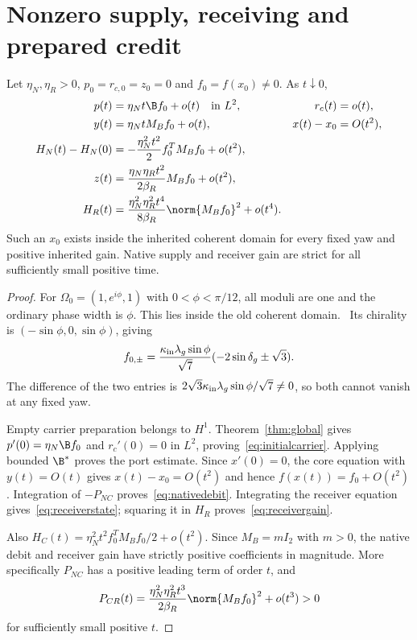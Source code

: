 \section{Nonzero supply, receiving and prepared credit}\label{sec:activity}
\begin{proposition}\label{prop:launch}
Let $\eta_N,\eta_R>0$, $p_0=r_{c,0}=z_0=0$ and $f_0=f(x_0)\ne0$. As $t\downarrow0$,
\begin{align}
 p(t)&=\eta_Nt\B f_0+o(t)\quad\hbox{in }L^2,
 &r_c(t)&=o(t),\label{eq:initialcarrier}\\
 y(t)&=\eta_NtM_Bf_0+o(t),
 &x(t)-x_0&=O(t^2),\label{eq:initialports}\\
 H_N(t)-H_N(0)&=-\frac{\eta_N^2t^2}{2}f_0^TM_Bf_0+o(t^2),\label{eq:nativedebit}\\
 z(t)&=\frac{\eta_N\eta_Rt^2}{2\beta_R}M_Bf_0+o(t^2),\label{eq:receiverstate}\\
 H_R(t)&=\frac{\eta_N^2\eta_R^2t^4}{8\beta_R}\norm{M_Bf_0}^2+o(t^4).\label{eq:receivergain}
\end{align}
Such an $x_0$ exists inside the inherited coherent domain for every fixed yaw and positive inherited gain. Native supply and receiver gain are strict for all sufficiently small positive time.
\end{proposition}
\begin{proof}
For $\Omega_0=(1,e^{i\phi},1)$ with $0<\phi<\pi/12$, all moduli are one and the ordinary phase width is $\phi$. This lies inside the old coherent domain.~\cite{intensity}
Its chirality is $(-\sin\phi,0,\sin\phi)$, giving
\begin{equation}\label{eq:nonzero}
 f_{0,\pm}=\frac{\kappa_{\rm in}\lambda_g\sin\phi}{\sqrt7}
          (-2\sin\delta_g\pm\sqrt3).
\end{equation}
The difference of the two entries is $2\sqrt3\kappa_{\rm in}\lambda_g\sin\phi/\sqrt7\ne0$, so both cannot vanish at any fixed yaw.

Empty carrier preparation belongs to $H^1$. Theorem~\ref{thm:global} gives $p'(0)=\eta_N\B f_0$ and $r_c'(0)=0$ in $L^2$, proving~\eqref{eq:initialcarrier}. Applying bounded $\B^*$ proves the port estimate. Since $x'(0)=0$, the core equation with $y(t)=O(t)$ gives $x(t)-x_0=O(t^2)$ and hence $f(x(t))=f_0+O(t^2)$. Integration of $-P_{NC}$ proves~\eqref{eq:nativedebit}. Integrating the receiver equation gives~\eqref{eq:receiverstate}; squaring it in $H_R$ proves~\eqref{eq:receivergain}.

Also $H_C(t)=\eta_N^2t^2 f_0^TM_Bf_0/2+o(t^2)$. Since $M_B=mI_2$ with $m>0$, the native debit and receiver gain have strictly positive coefficients in magnitude. More specifically $P_{NC}$ has a positive leading term of order $t$, and
\begin{equation}\label{eq:initialreceiverpower}
 P_{CR}(t)=\frac{\eta_N^2\eta_R^2t^3}{2\beta_R}\norm{M_Bf_0}^2+o(t^3)>0
\end{equation}
for sufficiently small positive $t$.
\end{proof}
